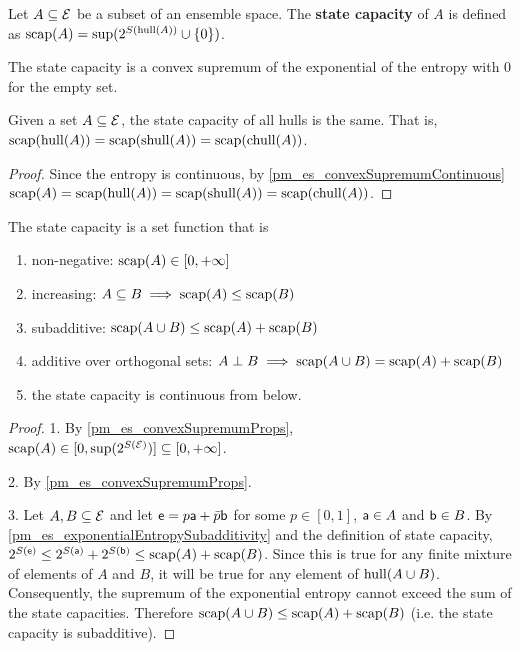 \begin{mathSection}
\begin{defn}
	Let $A \subseteq \Ens$ be a subset of an ensemble space. The \textbf{state capacity} of $A$ is defined as $\scap(A) = \sup(2^{S(\hull(A))}\cup\{0\})$.
\end{defn}

\begin{coro}
	The state capacity is a convex supremum of the exponential of the entropy with $0$ for the empty set.
\end{coro}

\begin{coro}
	Given a set $A \subseteq \Ens$, the state capacity of all hulls is the same. That is, $\scap(\hull(A)) = \scap(\shull(A)) = \scap(\chull(A))$.
\end{coro}

\begin{proof}
	Since the entropy is continuous, by \ref{pm_es_convexSupremumContinuous} $\scap(A) = \scap(\hull(A)) = \scap(\shull(A)) = \scap(\chull(A))$.
\end{proof}

\begin{prop}
	The state capacity is a set function that is
	\begin{enumerate}
		\item non-negative: $\scap(A) \in [0, +\infty]$
		\item increasing: $A \subseteq B \implies \scap(A) \leq \scap(B)$
		\item subadditive: $\scap(A \cup B) \leq \scap(A) + \scap(B)$
		\item additive over orthogonal sets: $A \ortho B \implies \scap(A \cup B) = \scap(A) + \scap(B)$ 
		\item the state capacity is continuous from below.
	\end{enumerate}
\end{prop}

\begin{proof}
	1. By \ref{pm_es_convexSupremumProps}, $\scap(A) \in [0, \sup(2^{S(\Ens)})] \subseteq [0,+\infty]$. 
	
	2. By \ref{pm_es_convexSupremumProps}.
	
	3. Let $A, B \subseteq \Ens$ and let $\ens = p \ens[a] + \bar{p} \ens[b]$ for some $p \in [0,1]$, $\ens[a] \in A$ and $\ens[b] \in B$. By \ref{pm_es_exponentialEntropySubadditivity} and the definition of state capacity, $2^{S(\ens)} \leq 2^{S(\ens[a])} + 2^{S(\ens[b])} \leq \scap(A) + \scap(B)$. Since this is true for any finite mixture of elements of $A$ and $B$, it will be true for any element of $\hull(A \cup B)$. Consequently, the supremum of the exponential entropy cannot exceed the sum of the state capacities. Therefore $\scap(A \cup B) \leq \scap(A) + \scap(B)$ (i.e. the state capacity is subadditive).
	

\end{proof}
\end{mathSection}
